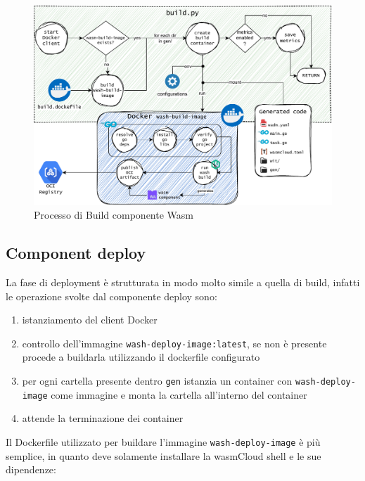 \FloatBarrier
\begin{figure}[h]
    \centering
    \includegraphics[width=\textwidth]{img/schemi/schemi-implementazione-build.drawio.pdf}
    \caption{Processo di Build componente Wasm}
    \label{fig:impl_build}
\end{figure}
\FloatBarrier

\subsection{Component deploy}

La fase di deployment è strutturata in modo molto simile a quella di build, infatti le operazione svolte dal componente deploy sono:

\begin{enumerate}
    \item istanziamento del client Docker
    \item controllo dell'immagine \texttt{wash-deploy-image:latest}, se non è presente procede a buildarla utilizzando il dockerfile configurato
    \item per ogni cartella presente dentro \texttt{gen} istanzia un container con \texttt{wash-deploy-image} come immagine e monta la cartella all'interno del container
    \item attende la terminazione dei container
\end{enumerate}

 Il Dockerfile utilizzato per buildare l'immagine \texttt{wash-deploy-image} è più semplice, in quanto deve solamente installare la wasmCloud shell e le sue dipendenze:
 
